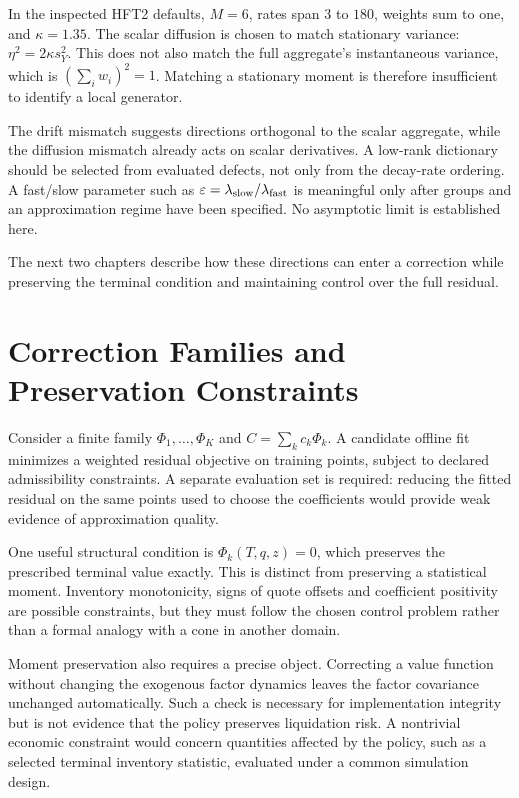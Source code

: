 In the inspected HFT2 defaults, $M=6$, rates span $3$ to $180$, weights sum to one, and $\kappa=1.35$. The scalar diffusion is chosen to match stationary variance: $\eta^2=2\kappa s_Y^2$. This does not also match the full aggregate's instantaneous variance, which is $(\sum_iw_i)^2=1$. Matching a stationary moment is therefore insufficient to identify a local generator.

The drift mismatch suggests directions orthogonal to the scalar aggregate, while the diffusion mismatch already acts on scalar derivatives. A low-rank dictionary should be selected from evaluated defects, not only from the decay-rate ordering. A fast/slow parameter such as $\varepsilon=\lambda_{\rm slow}/\lambda_{\rm fast}$ is meaningful only after groups and an approximation regime have been specified. No asymptotic limit is established here.

The next two chapters describe how these directions can enter a correction while preserving the terminal condition and maintaining control over the full residual.

\chapter{Correction Families and Preservation Constraints}

Consider a finite family $\Phi_1,\ldots,\Phi_K$ and $C=\sum_k c_k\Phi_k$. A candidate offline fit minimizes a weighted residual objective on training points, subject to declared admissibility constraints. A separate evaluation set is required: reducing the fitted residual on the same points used to choose the coefficients would provide weak evidence of approximation quality.

One useful structural condition is $\Phi_k(T,q,z)=0$, which preserves the prescribed terminal value exactly. This is distinct from preserving a statistical moment. Inventory monotonicity, signs of quote offsets and coefficient positivity are possible constraints, but they must follow the chosen control problem rather than a formal analogy with a cone in another domain.

Moment preservation also requires a precise object. Correcting a value function without changing the exogenous factor dynamics leaves the factor covariance unchanged automatically. Such a check is necessary for implementation integrity but is not evidence that the policy preserves liquidation risk. A nontrivial economic constraint would concern quantities affected by the policy, such as a selected terminal inventory statistic, evaluated under a common simulation design.

